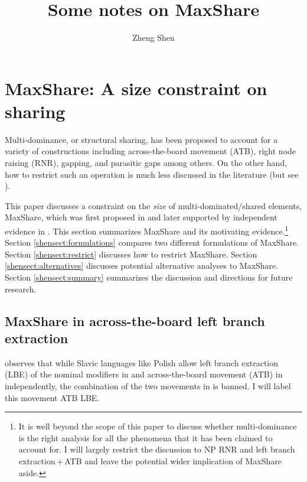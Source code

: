 \documentclass[output=paper]{langscibook}
\author{Zheng Shen\affiliation{National University of Singapore}}
\title{Some notes on MaxShare}
\begin{document}
\maketitle


\section{MaxShare: A size constraint on sharing}
\label{shensect:intro}
Multi-dominance, or structural sharing,  has been proposed to account for a variety of constructions including across-the-board movement (ATB), right node raising (RNR), gapping, and  parasitic gaps among others.
On the other hand, how to restrict such an operation is much less discussed in the literature (but see \citealt{Gracanin-Yuksek:2007}). 

This paper discusses a constraint on the \textit{size} of multi-dominated\slash shared elements, MaxShare, which was first proposed in \citet{Citko:2006} and later supported by independent evidence in \citet{Shen:2018a}.  
This section summarizes MaxShare and its motivating evidence.\footnote{It is well beyond the scope of this paper to discuss whether multi-dominance is the right analysis for all the phenomena that it has been claimed to account for. 
I will largely restrict the discussion to NP RNR and left branch extraction\,+\,ATB and leave the potential wider implication of MaxShare aside.}  
Section \ref{shensect:formulations} compares  two different formulations of MaxShare. 
Section \ref{shensect:restrict} discusses how to restrict MaxShare. 
Section \ref{shensect:alternatives} discusses potential alternative analyses to MaxShare. 
Section \ref{shensect:summary} summarizes the discussion and directions for future research.\largerpage[-1]

\subsection{MaxShare in across-the-board left branch extraction}
\label{shensect:atb}

\citet{Citko:2006} observes that while Slavic languages like Polish allow left branch extraction (LBE) of the nominal modifiers in  and across-the-board movement (ATB) in  independently, the combination of the two movements in  is banned. I will label this movement ATB LBE.
\end{document}
